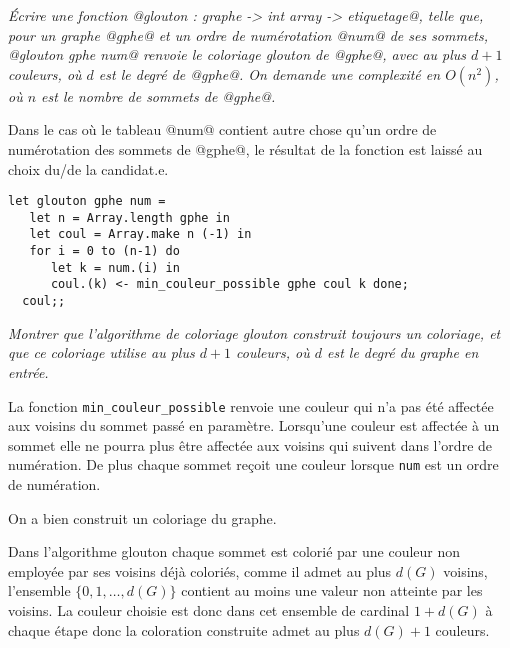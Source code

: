 \begin{Exercise}\it 
 Écrire une fonction @glouton : graphe -> int array -> etiquetage@, telle que, pour un graphe @gphe@ et un ordre de numérotation @num@ de ses sommets, @glouton gphe num@ renvoie le coloriage glouton de @gphe@, avec au plus $d+1$ couleurs, où $d$ est le degré de @gphe@. On demande une complexité en $O(n^2)$, où $n$ est le nombre de sommets de @gphe@. 

Dans le cas où le tableau @num@ contient autre chose qu'un ordre de numérotation des sommets de @gphe@, le résultat de la fonction est laissé au choix du/de la candidat.e.
\end{Exercise}  
\begin{Answer}
\begin{lstlisting}
let glouton gphe num =
   let n = Array.length gphe in
   let coul = Array.make n (-1) in
   for i = 0 to (n-1) do
      let k = num.(i) in
      coul.(k) <- min_couleur_possible gphe coul k done;
  coul;;
\end{lstlisting}
\end{Answer}
\begin{Exercise}\it 
 Montrer que l'algorithme de coloriage glouton construit toujours un coloriage, et que ce coloriage utilise au plus $d+1$ couleurs, où $d$ est le degré du graphe en entrée. 
\end{Exercise}  
\begin{Answer}
La fonction \texttt{min\_couleur\_possible} renvoie une couleur qui n'a pas été affectée aux voisins du sommet passé en paramètre.
Lorsqu'une couleur est affectée à un sommet elle ne pourra plus être affectée aux voisins qui suivent dans l'ordre de numération.
De plus chaque sommet reçoit une couleur lorsque \texttt{num} est un ordre de numération.

On a bien construit un coloriage du graphe.

\medskip

Dans l'algorithme glouton chaque sommet est colorié par une couleur non employée par ses voisins déjà coloriés, comme il admet au plus $d(G)$ voisins, l'ensemble $\{0, 1, \ldots, d(G)\}$ contient au moins une valeur non atteinte par les voisins. La couleur choisie est donc dans cet ensemble de cardinal $1+d(G)$ à chaque étape donc la coloration construite admet au plus $d(G)+1$ couleurs.
\end{Answer}

